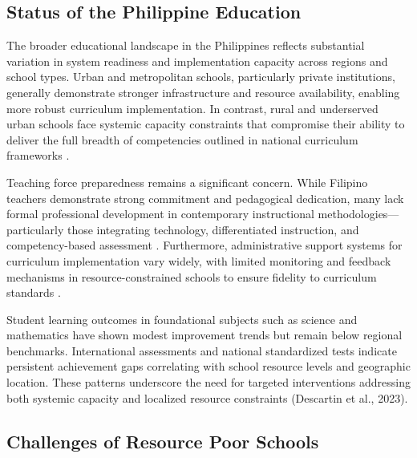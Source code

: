 \subsection{Status of the Philippine Education}

The broader educational landscape in the Philippines reflects substantial variation in system readiness and implementation capacity across regions and school types. Urban and metropolitan schools, particularly private institutions, generally demonstrate stronger infrastructure and resource availability, enabling more robust curriculum implementation. In contrast, rural and underserved urban schools face systemic capacity constraints that compromise their ability to deliver the full breadth of competencies outlined in national curriculum frameworks \cite{Kilag2024}.

Teaching force preparedness remains a significant concern. While Filipino teachers demonstrate strong commitment and pedagogical dedication, many lack formal professional development in contemporary instructional methodologies---particularly those integrating technology, differentiated instruction, and competency-based assessment \cite{Abragan2022}. Furthermore, administrative support systems for curriculum implementation vary widely, with limited monitoring and feedback mechanisms in resource-constrained schools to ensure fidelity to curriculum standards \cite{Gallego2024}.

Student learning outcomes in foundational subjects such as science and mathematics have shown modest improvement trends but remain below regional benchmarks. International assessments and national standardized tests indicate persistent achievement gaps correlating with school resource levels and geographic location. These patterns underscore the need for targeted interventions addressing both systemic capacity and localized resource constraints (Descartin et al., 2023).

\subsection{Challenges of Resource Poor Schools}

